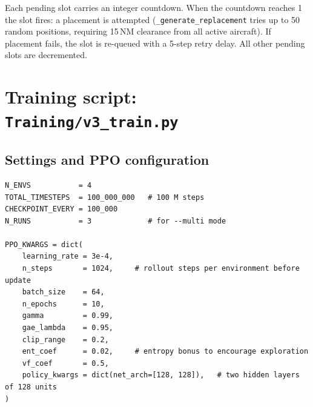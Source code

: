 \documentclass[11pt, a4paper]{article}
\begin{document}
Each pending slot carries an integer countdown.
When the countdown reaches 1 the slot fires: a placement is attempted
(\texttt{\_generate\_replacement} tries up to 50 random positions, requiring
15\,NM clearance from all active aircraft).
If placement fails, the slot is re-queued with a 5-step retry delay.
All other pending slots are decremented.

\section{Training script: \texttt{Training/v3\_train.py}}

\subsection{Settings and PPO configuration}

\begin{lstlisting}[caption={Top-level training constants and PPO hyperparameters.}]
N_ENVS           = 4
TOTAL_TIMESTEPS  = 100_000_000   # 100 M steps
CHECKPOINT_EVERY = 100_000
N_RUNS           = 3             # for --multi mode

PPO_KWARGS = dict(
    learning_rate = 3e-4,
    n_steps       = 1024,     # rollout steps per environment before update
    batch_size    = 64,
    n_epochs      = 10,
    gamma         = 0.99,
    gae_lambda    = 0.95,
    clip_range    = 0.2,
    ent_coef      = 0.02,     # entropy bonus to encourage exploration
    vf_coef       = 0.5,
    policy_kwargs = dict(net_arch=[128, 128]),   # two hidden layers of 128 units
)
\end{lstlisting}
\end{document}
